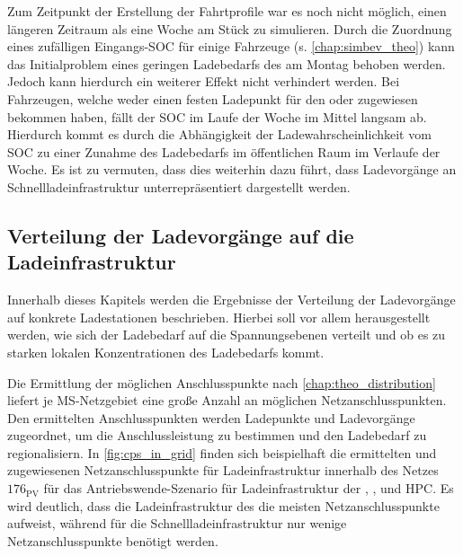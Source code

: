 

Zum Zeitpunkt der Erstellung der Fahrtprofile war es noch nicht möglich, einen längeren Zeitraum als eine Woche am Stück zu simulieren.
Durch die Zuordnung eines zufälligen Eingangs-\gls{SOC} für einige Fahrzeuge (s. \autoref{chap:simbev_theo}) kann das Initialproblem eines geringen Ladebedarfs des \UC \Firmeparkplatz am Montag behoben werden.
Jedoch kann hierdurch ein weiterer Effekt nicht verhindert werden.
Bei Fahrzeugen, welche weder einen festen Ladepunkt für den \UC \zH oder \Firmeparkplatz zugewiesen bekommen haben, fällt der \gls{SOC} im Laufe der Woche im Mittel langsam ab.
Hierdurch kommt es durch die Abhängigkeit der Ladewahrscheinlichkeit vom \gls{SOC} zu einer Zunahme des Ladebedarfs im öffentlichen Raum im Verlaufe der Woche.
Es ist zu vermuten, dass dies weiterhin dazu führt, dass Ladevorgänge an Schnellladeinfrastruktur un­ter­re­prä­sen­tiert dargestellt werden.


\subsection{Verteilung der Ladevorgänge auf die Ladeinfrastruktur}\label{chap:distribute_demand_ev}

Innerhalb dieses Kapitels werden die Ergebnisse der Verteilung der Ladevorgänge auf konkrete Ladestationen beschrieben.
Hierbei soll vor allem herausgestellt werden, wie sich der Ladebedarf auf die Spannungsebenen verteilt und ob es zu starken lokalen Konzentrationen des Ladebedarfs kommt.\medskip

Die Ermittlung der möglichen Anschlusspunkte nach \autoref{chap:theo_distribution} liefert je \gls{MS}-Netzgebiet eine große Anzahl an möglichen Netzanschlusspunkten.
Den ermittelten Anschlusspunkten werden Ladepunkte und Ladevorgänge zugeordnet, um die Anschlussleistung zu bestimmen und den Ladebedarf zu regionalisiern.
In \autoref{fig:cps_in_grid} finden sich beispielhaft die ermittelten und zugewiesenen Netzanschlusspunkte für Ladeinfrastruktur innerhalb des Netzes \(176_{\text{PV}}\) für das Antriebswende-Szenario für Ladeinfrastruktur der \UCs \zHdot, \Firmeparkplatzdot, \oeffen und \gls{HPC}.
Es wird deutlich, dass die Ladeinfrastruktur des \UC \zH die meisten Netzanschlusspunkte aufweist, während für die Schnellladeinfrastruktur nur wenige Netzanschlusspunkte benötigt werden.



